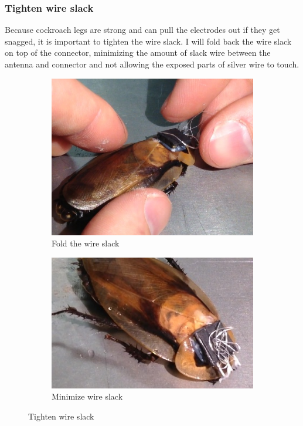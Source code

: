 \subsubsection{Tighten wire slack}
Because cockroach legs are strong and can pull the electrodes out if they get snagged, it is important to tighten the wire slack. I will fold back the wire slack on top of the connector, minimizing the amount of slack wire between the antenna and connector and not allowing the exposed parts of silver wire to touch. 
\begin{figure}[ht!]
\centering
    \begin{subfigure}{.5\textwidth}
    \centering
    \includegraphics[scale=0.3]{Surgery Photos/nowire.JPG}
    \caption{Fold the wire slack}
    \label{fig:nowire}
    \end{subfigure}
    \begin{subfigure}{.5\textwidth}
    \centering
    \includegraphics[scale=0.3]{Surgery Photos/nowire2.JPG}
    \caption{Minimize wire slack}
    \label{fig:nowire2}
    \end{subfigure}
\caption{Tighten wire slack}
\label{fig:connector}
\end{figure}
